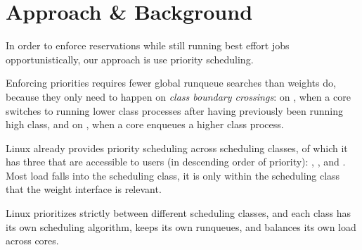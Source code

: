 \section{Approach \& Background}

In order to enforce reservations while still running best effort jobs
opportunistically, our approach is use priority scheduling.

Enforcing priorities requires fewer global runqueue searches than weights do,
because they only need to happen on \textit{class boundary crossings}: on
\exit{}, when a core switches to running lower class processes after having
previously been running high class, and on \entry{}, when a core enqueues a
higher class process. 

Linux already provides priority scheduling across scheduling classes, of which
it has three that are accessible to users (in descending order of priority):
\deadlineclass{}, \rtclass{}, and \normalclass{}. Most load falls into the
\normalclass{} scheduling class, it is only within the \normalclass{} scheduling
class that the \cgroups{} weight interface is relevant.

Linux prioritizes strictly between different scheduling classes, and each class
has its own scheduling algorithm, keeps its own runqueues, and balances its own
load across cores.

